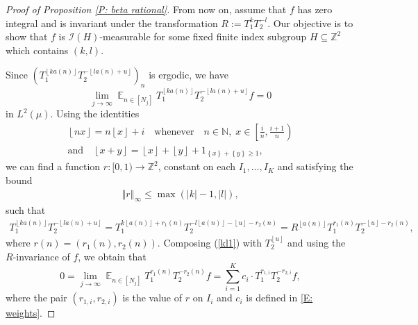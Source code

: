 \documentclass[11pt]{amsart}
\theoremstyle{definition}
\DeclareMathOperator*{\E}{\mathbb{E}}
\newcommand{\N}{{\mathbb N}}
\newcommand{\Z}{{\mathbb Z}}
\newcommand{\CI}{{\mathcal I}}
\newcommand{\norm}[1]{\left\Vert #1\right\Vert}
\newcommand{\1}{{\mathbf{1}}}
\newcommand{\floor}[1]{{\left \lfloor #1 \right \rfloor}}
\newcommand{\rem}[1]{\left \{ #1 \right \}}
\begin{document}
\begin{proof}[Proof of Proposition \ref{P: beta rational}]
From now on, assume that $f$ has zero integral and is invariant under the transformation $R:=T_1^kT_2^{-l}$. Our objective is to show that $f$ is $\CI(H)$-measurable for some fixed finite index subgroup $H\subseteq \Z^2$ {which contains $(k,l)$}.

Since $(T_{1}^{\floor{ka(n)}}T_{2}^{-\floor{la(n)+u}})_{n}$ is ergodic, we have
\begin{equation}\label{kl1}
    \lim_{j\to\infty}\E_{n\in[N_j]}T_{1}^{\floor{ka(n)}}T_{2}^{-\floor{la(n)+u}}f=0
\end{equation}
in $L^2(\mu)$.
Using the identities
\begin{gather*}
 \floor{n x} = n\floor{x} + i \quad\textrm{whenever}\quad n\in\N,\; x\in\left[\frac{i}{n}, \frac{i+1}{n}\right)\\
 \textrm{and}\quad  \floor{x + y}=\floor{x}+\floor{y}+1_{\rem{x}+\rem{y}\geq 1},
\end{gather*}
we can find a function $r:[0,1)\to\Z^2$, constant on each $I_1, \ldots, I_K$ and satisfying the bound
\begin{align}\label{E: bound on r}
\norm{r}_\infty \leq  \max(|k|-1, |l|),    
\end{align}
 such that 
\begin{align*}
    T_{1}^{\floor{ka(n)}}T_{2}^{-\floor{la(n)+u}}=T_{1}^{k\floor{a(n)} + r_1(n)}T_{2}^{-l\floor{a(n)}-\floor{u}-r_2(n)} = R^{\floor{a(n)}}T_1^{r_1(n)}T_2^{-\floor{u}-r_2(n)},
\end{align*}
where $r(n)=(r_1(n), r_2(n))$.
Composing (\ref{kl1}) with $T_2^{\floor{u}}$ and using the $R$-invariance of $f$, we obtain that
\begin{equation}\label{kl2}
    0=\lim_{j\to\infty}\E_{n\in[N_{j}]}T_1^{r_1(n)}T_2^{-r_2(n)}f=\sum_{i=1}^{K}c_{i}\cdot T_1^{r_{1,i}}T_2^{-r_{2,i}} f,
\end{equation}
where %
the pair $(r_{1,i}, r_{2,i})$ is the value of $r$ on $I_i$ and $c_i$ is defined in \eqref{E: weights}.


\end{proof}
\end{document}
